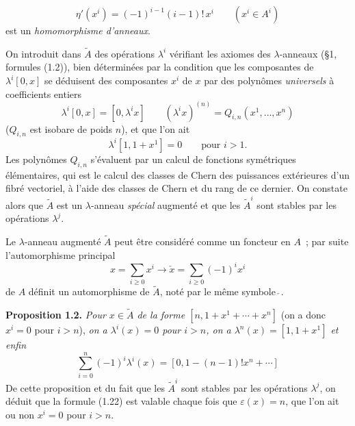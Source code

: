 \begin{equation}\tag{1.19}
\eta'(x^i)=(-1)^{i-1}(i-1)!\,x^i\qquad (x^i\in A^i)
\end{equation}
est un \emph{homomorphisme d'anneaux}.

On introduit dans $\widetilde A$ des opérations $\lambda^i$ vérifiant les axiomes des $\lambda$-anneaux (\S 1, formules (1.2)), bien déterminées par la condition que les composantes de $\lambda^i[0,x]$ se déduisent des composantes $x^i$ de $x$ par des polynômes \emph{universels} à coefficients entiers
\begin{equation}\tag{1.20}
\lambda^i[0,x]=[0,\lambda^i x]\qquad (\lambda^i x)^{(n)}=Q_{i,n}(x^1,\ldots,x^n)
\end{equation}
($Q_{i,n}$ est isobare de poids $n$), et que l'on ait
\begin{equation}\tag{1.21}
\lambda^i[1,1+x^1]=0\qquad\text{pour }i>1.
\end{equation}
Les polynômes $Q_{i,n}$ s'évaluent par un calcul de fonctions symétriques élémentaires, qui est le calcul des classes de Chern des puissances extérieures d'un fibré vectoriel, à l'aide des classes de Chern et du rang de ce dernier. On constate alors que $\widetilde A$ est un $\lambda$-anneau \emph{spécial} augmenté et que les $\widetilde A^i$ sont stables par les opérations $\lambda^j$.

Le $\lambda$-anneau augmenté $\widetilde A$ peut être considéré comme un foncteur en $A$~; par suite l'automorphisme principal
\[
x=\sum_{i\geq0}x^i\longrightarrow \check x=\sum_{i\geq0}(-1)^i x^i
\]
de $A$ définit un automorphisme de $\widetilde A$, noté par le même symbole $\check{\ }$.

\textbf{Proposition 1.2.} \emph{Pour $x\in\widetilde A$ de la forme $[n,1+x^1+\cdots+x^n]$} (on a donc $x^i=0$ pour $i>n$), \emph{on a $\lambda^i(x)=0$ pour $i>n$, on a $\lambda^n(x)=[1,1+x^1]$ et enfin}
\begin{equation}\tag{1.22}
\sum_{i=0}^n(-1)^i\lambda^i(x)=[0,1-(n-1)!x^n+\cdots]
\end{equation}
De cette proposition et du fait que les $\widetilde A^i$ sont stables par les opérations $\lambda^j$, on déduit que la formule (1.22) est valable chaque fois que $\varepsilon(x)=n$, que l'on ait ou non $x^i=0$ pour $i>n$.

